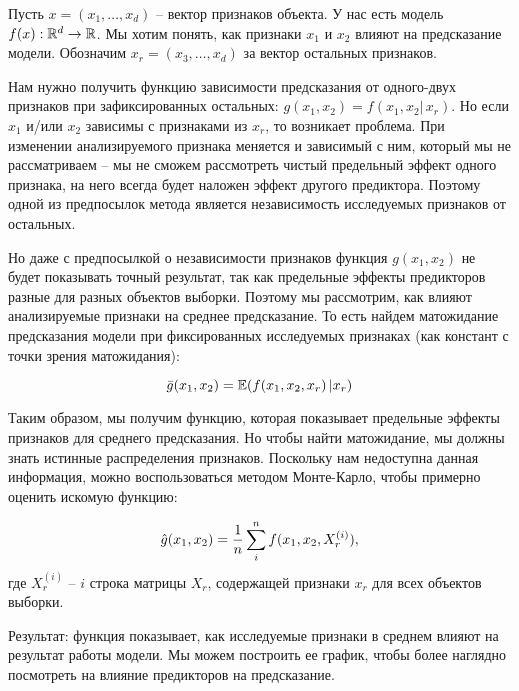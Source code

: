 Пусть $x = (x_1, \ldots, x_d)$ -- вектор признаков объекта. У нас есть модель $f(x): \mathbb{R}^d \rightarrow \mathbb{R}$. Мы хотим понять, как признаки $x_1$ и $x_2$ влияют на предсказание модели. Обозначим $x_r = (x_3, \ldots, x_d)$ за вектор остальных признаков.

Нам нужно получить функцию зависимости предсказания от одного-двух признаков при зафиксированных остальных: $g(x_1, x_2) = f(x_1, x_2 | \, x_r)$. %
Но если $x_1$ и/или $x_2$ зависимы с признаками из $x_r$, то возникает проблема. При изменении анализируемого признака меняется и зависимый с ним, который мы не рассматриваем -- мы не сможем рассмотреть чистый предельный эффект одного признака, на него всегда будет наложен эффект другого предиктора. Поэтому одной из предпосылок метода является независимость исследуемых признаков от остальных.

Но даже с предпосылкой о независимости признаков функция $g(x_1, x_2)$ не будет показывать точный результат, так как предельные эффекты предикторов разные для разных объектов выборки. Поэтому мы рассмотрим, как влияют анализируемые признаки на среднее предсказание. То есть найдем матожидание предсказания модели при фиксированных исследуемых признаках (как констант с точки зрения матожидания):

\[
\bar{g}(x_1, x_2) = \mathbb{E}(f(x_1, x_2, x_r) \, | x_r)
\]

Таким образом, мы получим функцию, которая показывает предельные эффекты признаков для среднего предсказания. Но чтобы найти матожидание, мы должны знать истинные распределения признаков. Поскольку нам недоступна данная информация, можно воспользоваться методом Монте-Карло, чтобы примерно оценить искомую функцию:

\[
\hat{g}(x_1, x_2) = \frac{1}{n} \sum\limits_i^n f(x_1, x_2, X_r^{(i)}),
\]
где $X_r^{(i)}$ -- $i$ строка матрицы $X_r$, содержащей признаки $x_r$ для всех объектов выборки.

Результат: функция показывает, как исследуемые признаки в среднем влияют на результат работы модели. Мы можем построить ее график, чтобы более наглядно посмотреть на влияние предикторов на предсказание.%




